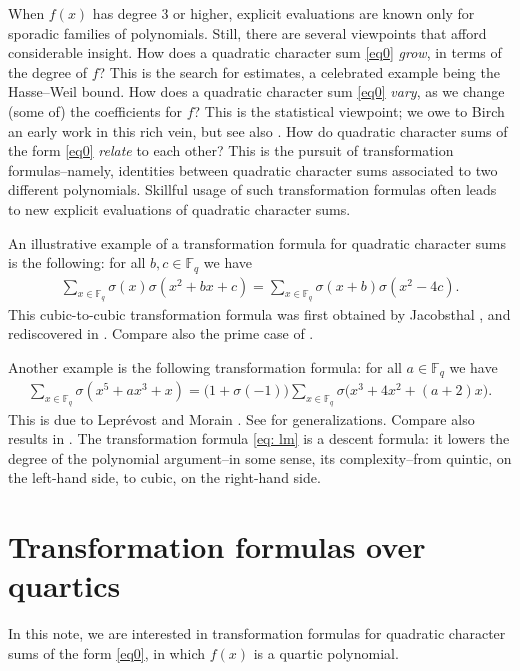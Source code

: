 \documentclass[11pt]{amsart}
\newcommand{\F}{\mathbb{F}}
\newcommand{\Fq}{\F_{\!q}}
\theoremstyle{definition}
\begin{document}
When $f(x)$ has degree $3$ or higher, explicit evaluations are known only for sporadic families of polynomials. Still, there are several viewpoints that afford considerable insight. How does a quadratic character sum \eqref{eq0} \emph{grow}, in terms of the degree of $f$? This is the search for estimates, a celebrated example being the Hasse--Weil bound. How does a quadratic character sum \eqref{eq0} \emph{vary}, as we change (some of) the coefficients for $f$? This is the statistical viewpoint; we owe to Birch \cite{B} an early work in this rich vein, but see also \cite{N2}. How do quadratic character sums of the form \eqref{eq0} \emph{relate} to each other? This is the pursuit of transformation formulas--namely, identities between quadratic character sums associated to two different polynomials. Skillful usage of such transformation formulas often leads to new explicit evaluations of quadratic character sums.

An illustrative example of a transformation formula for quadratic character sums is the following: for all $b,c\in \Fq$ we have
\begin{align}\label{eq: jac}
\sum_{x\in \Fq} \sigma(x)\sigma(x^2+bx+c)=\sum_{x\in \Fq} \sigma(x+b)\sigma(x^2-4c).
\end{align}
This cubic-to-cubic transformation formula was first obtained by Jacobsthal \cite{Jac}, and rediscovered in \cite[Thm.1]{PAR}. Compare also the prime case of \cite[Thm.1.2]{KPSV}.

Another example is the following transformation formula: for all $a\in \Fq$ we have
\begin{align}\label{eq: lm}
\sum_{x\in \Fq} \sigma(x^5+ax^3+x)=\big(1+\sigma(-1)\big)\sum_{x\in \Fq} \sigma\big(x^3+4x^2+(a+2)x\big).
\end{align}
This is due to Lepr\'evost and Morain \cite[Thm.1]{LM}. See \cite[Exer.5.29, Thm.5.20]{N} for generalizations. Compare also results in \cite[Secs.4,5]{KPSV}. The transformation formula \eqref{eq: lm} is a descent formula: it lowers the degree of the polynomial argument--in some sense, its complexity--from quintic, on the left-hand side, to cubic, on the right-hand side. 


\section{Transformation formulas over quartics}
In this note, we are interested in transformation formulas for quadratic character sums of the form \eqref{eq0}, in which $f(x)$ is a quartic polynomial. 
\end{document}
